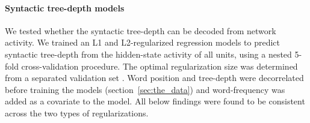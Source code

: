 \paragraph{Syntactic tree-depth models}\label{ssec:regress_model} We tested whether the syntactic tree-depth can be decoded from network activity. We trained an L1 and L2-regularized regression models to predict syntactic tree-depth from the hidden-state activity of all units, using a nested 5-fold cross-validation procedure. The optimal regularization size was determined from a separated validation set . Word position and tree-depth were decorrelated before training the models (section~\ref{sec:the_data}) and word-frequency was added as a covariate to the model. All below findings were found to be consistent across the two types of regularizations.

